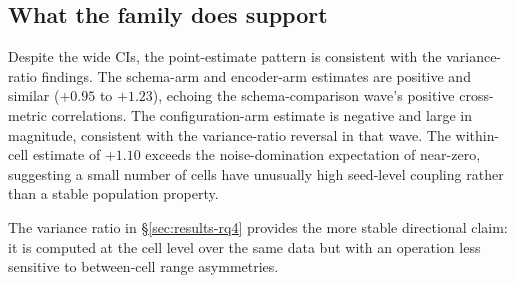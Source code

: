 \subsection{What the family does support}

Despite the wide CIs, the point-estimate pattern is consistent with
the variance-ratio findings. The schema-arm and encoder-arm
estimates are positive and similar ($+0.95$ to $+1.23$), echoing the
schema-comparison wave's positive cross-metric correlations. The
configuration-arm estimate is negative and large in magnitude,
consistent with the variance-ratio reversal in that wave. The
within-cell estimate of $+1.10$ exceeds the noise-domination
expectation of near-zero, suggesting a small number of cells have
unusually high seed-level coupling rather than a stable population
property.

The variance ratio in \S\ref{sec:results-rq4} provides the more stable directional
claim: it is computed at the cell level over the same data but with
an operation less sensitive to between-cell range asymmetries.